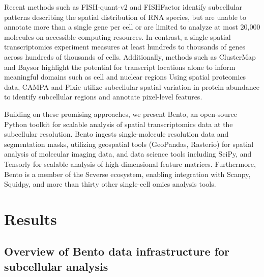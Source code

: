 Recent methods such as FISH-quant-v2\cite{imbertFISHquantV2Scalable2022} and FISHFactor\cite{walterFISHFactorProbabilisticFactor} identify subcellular patterns describing the spatial distribution of RNA species, but are unable to annotate more than a single gene per cell or are limited to analyze at most 20,000 molecules on accessible computing resources. In contrast, a single spatial transcriptomics experiment measures at least hundreds to thousands of genes across hundreds of thousands of cells. Additionally, methods such as ClusterMap\cite{heClusterMapMultiscaleClustering2021} and Baysor\cite{petukhovBayesianSegmentationSpatially2020} highlight the potential for transcript locations alone to inform meaningful domains such as cell and nuclear regions Using spatial proteomics data, CAMPA\cite{spitzerLearningConsistentSubcellular} and Pixie\cite{liuRobustPhenotypingHighly2023} utilize subcellular spatial variation in protein abundance to identify subcellular regions and annotate pixel-level features. 

Building on these promising approaches, we present Bento, an open-source Python toolkit for scalable analysis of spatial transcriptomics data at the subcellular resolution. Bento ingests single-molecule resolution data and segmentation masks, utilizing geospatial tools (GeoPandas\cite{GeopandasGeopandasV0}, Rasterio\cite{gilliesRasterioGeospatialRaster}) for spatial analysis of molecular imaging data, and data science tools including SciPy\cite{virtanenSciPyFundamentalAlgorithms2020}, and Tensorly\cite{kossaifiTensorLyTensorLearning2019} for scalable analysis of high-dimensional feature matrices. Furthermore, Bento is a member of the Scverse ecosystem, enabling integration with Scanpy\cite{wolfSCANPYLargescaleSinglecell2018}, Squidpy\cite{pallaSquidpyScalableFramework2021}, and more than thirty other single-cell omics analysis tools.

\section{Results}

\subsection{Overview of Bento data infrastructure for subcellular analysis}

